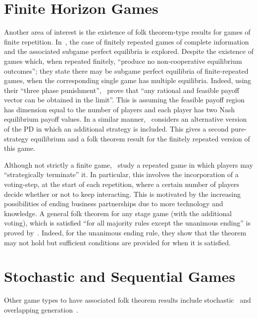 \section{Finite Horizon Games}\label{sec:Finite_Horizon_Games}
Another area of interest is the existence of folk theorem-type results for games
of finite repetition. In~\cite{Benoit_1985}, the case of
finitely repeated games of complete information and the associated subgame
perfect equilibria is explored. Despite the existence of games which, when
repeated finitely, ``produce no non-cooperative equilibrium outcomes''; they
state there may be subgame perfect equilibria of finite-repeated games, when the
corresponding single game has multiple equilibria. Indeed, using their ``three
phase punishment'',~\cite{Benoit_1985} prove that ``any rational and feasible
payoff vector can be obtained in the limit''. This is assuming the feasible
payoff region has dimension equal to the number of players and each player has
two Nash equilibrium payoff values. In a similar manner,~\cite{ANGELOVA2011}
considers an alternative version of the PD in which an additional strategy is
included. This gives a second pure-strategy equilibrium and a folk theorem
result for the finitely repeated version of this game. 

Although not strictly a finite game,~\cite{Fujiwara-Greve2018} study a repeated
game in which players may ``strategically terminate'' it. In particular, this
involves the incorporation of a voting-step, at the start of each repetition,
where a certain number of players decide whether or not to keep interacting.
This is motivated by the increasing possibilities of ending business
partnerships due to more technology and knowledge. A general folk theorem for
any stage game (with the additional voting), which is satisfied ``for all
majority rules except the unanimous ending'' is proved by~\cite{Fujiwara-Greve2018}. Indeed, for the unanimous ending rule, they
show that the theorem may not hold but sufficient conditions are
provided for when it is satisfied.


\section{Stochastic and Sequential Games}\label{sec:Stochastic_and_Sequential_Games}
Other game types to have associated folk theorem results include
stochastic~\cite{Dutta1995} and overlapping generation~\cite{Bhaskar1998,
Gossner1996}.

